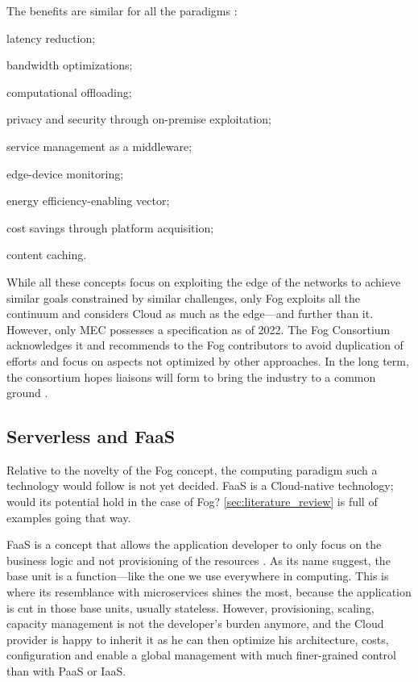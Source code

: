 The benefits are similar for all the paradigms \cite{ahmed_fog_2019, ai_edge_2018}:
\begin{enumerate*}[(1)]
	\item latency reduction;
	\item bandwidth optimizations;
	\item computational offloading;
	\item privacy and security through on-premise exploitation;
	\item service management as a middleware;
	\item edge-device monitoring;
	\item energy efficiency-enabling vector;
	\item cost savings through platform acquisition;
	\item content caching.
\end{enumerate*}

While all these concepts focus on exploiting the edge of the networks to achieve similar goals constrained by similar challenges, only Fog exploits all the continuum and considers Cloud as much as the edge—and further than it. However, only \gls{MEC} possesses a specification as of 2022. The Fog Consortium acknowledges it and recommends to the Fog contributors to avoid duplication of efforts and focus on aspects not optimized by other approaches. In the long term, the consortium hopes liaisons will form to bring the industry to a common ground \cite{ieee_standards_association_ieee_2018}.

\hypersetup{linkcolor=}
\subsection{Serverless and \acrfull{FaaS}}

Relative to the novelty of the Fog concept, the computing paradigm such a technology would follow is not yet decided. \gls{FaaS} is a Cloud-native technology; would its potential hold in the case of Fog? \cref{sec:literature_review} is full of examples going that way.

\gls{FaaS} is a concept that allows the application developer to only focus on the business logic and not provisioning of the resources \cite{redhat_what_2020}. As its name suggest, the base unit is a function—like the one we use everywhere in computing. This is where its resemblance with microservices shines the most, because the application is cut in those base units, usually stateless. However, provisioning, scaling, capacity management is not the developer's burden anymore, and the Cloud provider is happy to inherit it as he can then optimize his architecture, costs, configuration and enable a global management with much finer-grained control than with \gls{PaaS} or \gls{IaaS}.

